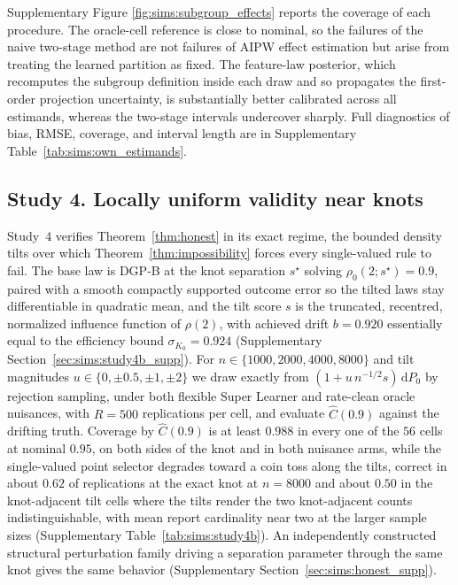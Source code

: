 \documentclass[11pt]{article}
\begin{document}
Supplementary Figure \ref{fig:sims:subgroup_effects} reports the coverage of each procedure. The oracle-cell reference is close to nominal, so the failures of the naive two-stage method are not failures of AIPW effect estimation but arise from treating the learned partition as fixed. The feature-law posterior, which recomputes the subgroup definition inside each draw and so propagates the first-order projection uncertainty, is substantially better calibrated across all estimands, whereas the two-stage intervals undercover sharply. Full diagnostics of bias, RMSE, coverage, and interval length are in Supplementary Table~\ref{tab:sims:own_estimands}.

\subsection{Study 4. Locally uniform validity near knots}\label{sec:sims:honest}

Study~4 verifies Theorem~\ref{thm:honest} in its exact regime, the bounded density tilts over which Theorem~\ref{thm:impossibility} forces every single-valued rule to fail. The base law is DGP-B at the knot separation $s^\star$ solving $\rho_0(2;s^\star)=0.9$, paired with a smooth compactly supported outcome error so the tilted laws stay differentiable in quadratic mean, and the tilt score $s$ is the truncated, recentred, normalized influence function of $\rho(2)$, with achieved drift $b=0.920$ essentially equal to the efficiency bound $\sigma_{K_0}=0.924$ (Supplementary Section~\ref{sec:sims:study4b_supp}). For $n\in\{1000,2000,4000,8000\}$ and tilt magnitudes $u\in\{0,\pm0.5,\pm1,\pm2\}$ we draw exactly from $(1+u\,n^{-1/2}s)\,\mathrm dP_0$ by rejection sampling, under both flexible Super Learner and rate-clean oracle nuisances, with $R=500$ replications per cell, and evaluate $\widehat C(0.9)$ against the drifting truth. Coverage by $\widehat C(0.9)$ is at least $0.988$ in every one of the $56$ cells at nominal $0.95$, on both sides of the knot and in both nuisance arms, while the single-valued point selector degrades toward a coin toss along the tilts, correct in about $0.62$ of replications at the exact knot at $n=8000$ and about $0.50$ in the knot-adjacent tilt cells where the tilts render the two knot-adjacent counts indistinguishable, with mean report cardinality near two at the larger sample sizes (Supplementary Table~\ref{tab:sims:study4b}). An independently constructed structural perturbation family driving a separation parameter through the same knot gives the same behavior (Supplementary Section~\ref{sec:sims:honest_supp}).
\end{document}

